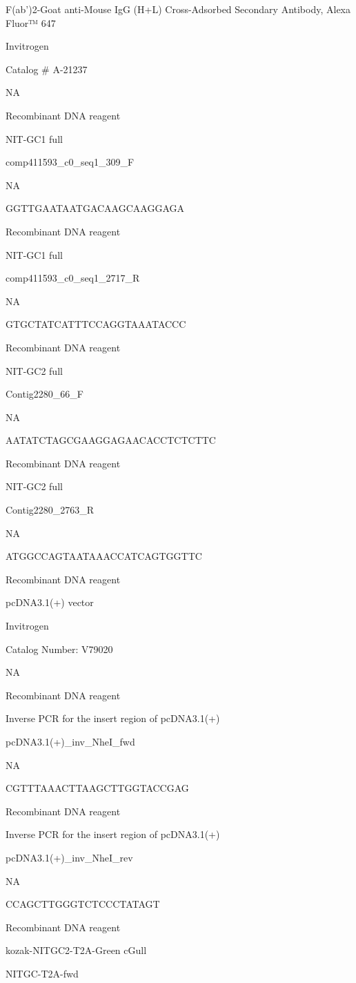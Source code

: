 \documentclass[
  10pt,
  onecolumn]{article}
\begin{document}
F(ab')2-Goat anti-Mouse IgG (H+L) Cross-Adsorbed Secondary Antibody,
Alexa Fluor™ 647

Invitrogen

Catalog \# A-21237

NA

Recombinant DNA reagent

NIT-GC1 full

comp411593\_c0\_seq1\_309\_F

NA

GGTTGAATAATGACAAGCAAGGAGA

Recombinant DNA reagent

NIT-GC1 full

comp411593\_c0\_seq1\_2717\_R

NA

GTGCTATCATTTCCAGGTAAATACCC

Recombinant DNA reagent

NIT-GC2 full

Contig2280\_66\_F

NA

AATATCTAGCGAAGGAGAACACCTCTCTTC

Recombinant DNA reagent

NIT-GC2 full

Contig2280\_2763\_R

NA

ATGGCCAGTAATAAACCATCAGTGGTTC

Recombinant DNA reagent

pcDNA3.1(+) vector

Invitrogen

Catalog Number: V79020

NA

Recombinant DNA reagent

Inverse PCR for the insert region of pcDNA3.1(+)

pcDNA3.1(+)\_inv\_NheI\_fwd

NA

CGTTTAAACTTAAGCTTGGTACCGAG

Recombinant DNA reagent

Inverse PCR for the insert region of pcDNA3.1(+)

pcDNA3.1(+)\_inv\_NheI\_rev

NA

CCAGCTTGGGTCTCCCTATAGT

Recombinant DNA reagent

kozak-NITGC2-T2A-Green cGull

NITGC-T2A-fwd
\end{document}
